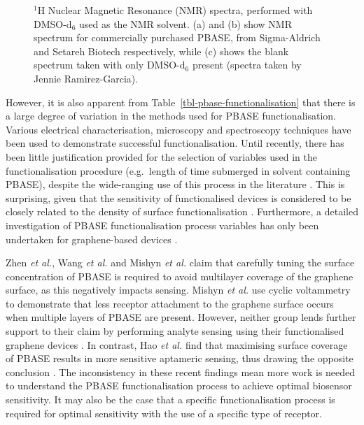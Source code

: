 \documentclass[
  a4paper,
]{scrbook}
\begin{document}
\begin{figure}
\begin{minipage}[t]{\linewidth}
{{}

}

\subcaption{\label{fig-dmso-nmr}}
\end{minipage}%

\caption{\label{fig-pbase-nmr}\(^{1}\)H Nuclear Magnetic Resonance (NMR)
spectra, performed with DMSO-d\(_6\) used as the NMR solvent. (a) and
(b) show NMR spectrum for commercially purchased PBASE, from
Sigma-Aldrich and Setareh Biotech respectively, while (c) shows the
blank spectrum taken with only DMSO-d\(_6\) present (spectra taken by
Jennie Ramirez-Garcia).}

\end{figure}

However, it is also apparent from
Table~\ref{tbl-pbase-functionalisation} that there is a large degree of
variation in the methods used for PBASE functionalisation. Various
electrical characterisation, microscopy and spectroscopy techniques have
been used to demonstrate successful functionalisation. Until recently,
there has been little justification provided for the selection of
variables used in the functionalisation procedure (e.g.~length of time
submerged in solvent containing PBASE), despite the wide-ranging use of
this process in the literature \autocite{Hinnemo2017,Zhen2018,Wang2020}.
This is surprising, given that the sensitivity of functionalised devices
is considered to be closely related to the density of surface
functionalisation \autocite{White2008,Hermanson2013-3,Chen2014}.
Furthermore, a detailed investigation of PBASE functionalisation process
variables has only been undertaken for graphene-based devices
\autocite{Zhen2018,Hao2020,Wang2020,Mishyn2022}.

Zhen \emph{et al.}, Wang \emph{et al.} and Mishyn \emph{et al.} claim
that carefully tuning the surface concentration of PBASE is required to
avoid multilayer coverage of the graphene surface, as this negatively
impacts sensing. Mishyn \emph{et al.} use cyclic voltammetry to
demonstrate that less receptor attachment to the graphene surface occurs
when multiple layers of PBASE are present. However, neither group lends
further support to their claim by performing analyte sensing using their
functionalised graphene devices \autocite{Zhen2018,Mishyn2022}. In
contrast, Hao \emph{et al.} find that maximising surface coverage of
PBASE results in more sensitive aptameric sensing, thus drawing the
opposite conclusion \autocite{Hao2020}. The inconsistency in these
recent findings mean more work is needed to understand the PBASE
functionalisation process to achieve optimal biosensor sensitivity. It
may also be the case that a specific functionalisation process is
required for optimal sensitivity with the use of a specific type of
receptor.
\end{document}
